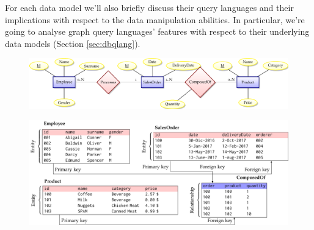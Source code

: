 For each data model we'll also briefly discuss their query languages and their implications with respect to the data manipulation abilities. In particular, we're going to analyse graph query languages' features with respect to their underlying data models (Section \ref{sec:dbqlang}).
\begin{figure}[!pth]
	\begin{minipage}[b]{\textwidth}
		\includegraphics[scale=.6]{fig/02models/01erschema}
		\label{fig:erschema}
	\end{minipage}\quad

	\begin{minipage}[b]{\textwidth}
		\includegraphics[scale=.7]{fig/02models/02instance}
		\label{fig:instance}
	\end{minipage}


\end{figure}
